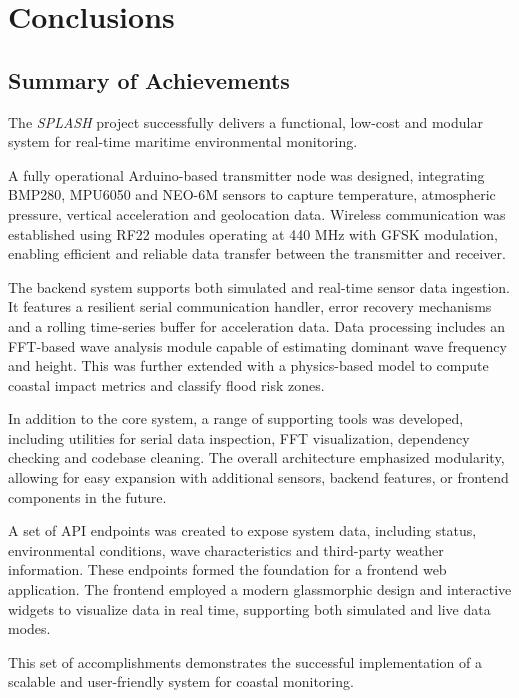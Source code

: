 \documentclass{article}
\begin{document}
\newpage
\section{Conclusions}
    \subsection{Summary of Achievements}

    The \textit{SPLASH} project successfully delivers a functional, low-cost and modular system for real-time maritime environmental monitoring. 
    
    A fully operational Arduino-based transmitter node was designed, integrating BMP280, MPU6050 and NEO-6M sensors to capture temperature, atmospheric pressure, vertical acceleration and geolocation data. Wireless communication was established using RF22 modules operating at 440 MHz with GFSK modulation, enabling efficient and reliable data transfer between the transmitter and receiver.
    
    The backend system supports both simulated and real-time sensor data ingestion. It features a resilient serial communication handler, error recovery mechanisms and a rolling time-series buffer for acceleration data. Data processing includes an FFT-based wave analysis module capable of estimating dominant wave frequency and height. This was further extended with a physics-based model to compute coastal impact metrics and classify flood risk zones.
    
    In addition to the core system, a range of supporting tools was developed, including utilities for serial data inspection, FFT visualization, dependency checking and codebase cleaning. The overall architecture emphasized modularity, allowing for easy expansion with additional sensors, backend features, or frontend components in the future.
    
    A set of API endpoints was created to expose system data, including status, environmental conditions, wave characteristics and third-party weather information. These endpoints formed the foundation for a frontend web application. The frontend employed a modern glassmorphic design and interactive widgets to visualize data in real time, supporting both simulated and live data modes.
    
    This set of accomplishments demonstrates the successful implementation of a scalable and user-friendly system for coastal monitoring.
    
\end{document}
